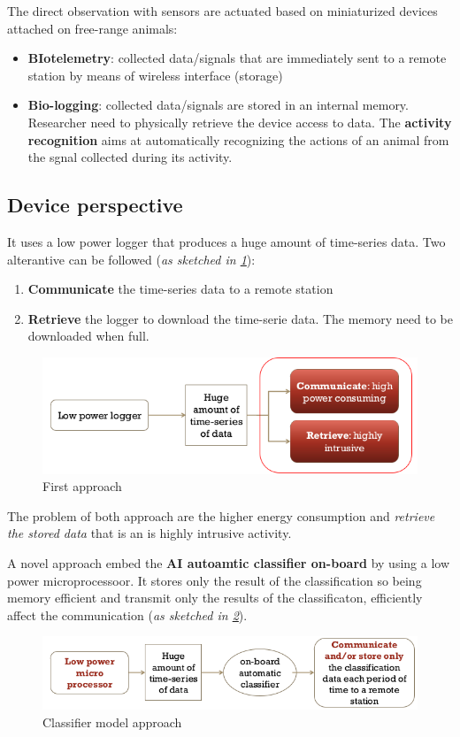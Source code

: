 \documentclass[10pt,a4paper]{report}
\theoremstyle{definition}
\begin{document}
The direct observation with sensors are actuated based on miniaturized devices attached on free-range animals:
\begin{itemize}
	\item 
	\textbf{BIotelemetry}: collected data/signals that are immediately sent to a remote station by means of wireless interface (storage)
	\item 
	\textbf{Bio-logging}: collected data/signals are stored in an internal memory. Researcher need to physically retrieve the device access to data.
	The \textbf{activity recognition} aims at automatically recognizing the actions of an animal from the sgnal collected during its activity.
\end{itemize}
\subsection{Device perspective}\label{sec:device-perspective}
It uses a low power logger that produces a huge amount of time-series data. Two alterantive can be followed (\textit{as sketched in \ref{approach-1-animal}}):
\begin{enumerate}
	\item 
	\textbf{Communicate} the time-series data to a remote station
	\item 
	\textbf{Retrieve} the logger to download the time-serie data. The memory need to be downloaded when full.
\end{enumerate}

\begin{figure}[h]
	\centering\includegraphics[scale=0.50]{images/Pasted image 20230401153838.png}
	\caption{First approach}
	\label{approach-1-animal}
\end{figure}

The problem of both approach are the higher energy consumption and \textit{retrieve the stored data} that is an is highly intrusive activity.


A novel approach embed the \textbf{AI autoamtic classifier on-board} by using a low power microprocessoor. It stores only the result of the classification so being memory efficient and transmit only the results of the classificaton, efficiently affect the communication (\textit{as sketched in \ref{approach-2-animal}}).
\begin{figure}[h!]
	\centering\includegraphics[scale=0.50]{images/Pasted image 20230401153826.png}
	\caption{Classifier model approach}
	\label{approach-2-animal}
\end{figure}
\end{document}
